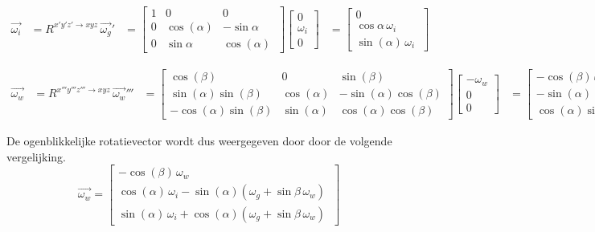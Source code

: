 \begin{equation*}
\begin{split}
\overrightarrow{\omega_{i}}
&=R^{x'y'z' \rightarrow xyz}\,\overrightarrow{\omega_{g}}'
&=	  \begin{bmatrix}
      1 & 0 & 0\\
      0 & \cos(\alpha) & -\sin{\alpha}\\ 
      0 & \sin{\alpha} & \cos(\alpha)\
      \end{bmatrix}
      \begin{bmatrix}
      0\\
      \omega_{i}\\
      0\
      \end{bmatrix}     
&=	  \begin{bmatrix}
      0\\
      \cos{\alpha}\,\omega_{i}\\
      \sin(\alpha)\,\omega_{i}\
      \end{bmatrix}
\end{split}
\end{equation*}

\begin{equation*}
\begin{split}
\overrightarrow{\omega_{w}}
&=R^{x'''y'''z''' \rightarrow xyz}\,\overrightarrow{\omega_{w}}'''
&=	  \begin{bmatrix}
      \cos(\beta) & 0 & \sin(\beta)\\
      \sin(\alpha)\sin(\beta) & \cos(\alpha) & -\sin(\alpha)\cos(\beta)\\
      -\cos(\alpha)\sin(\beta) & \sin(\alpha) & \cos(\alpha)\cos(\beta)\  
      \end{bmatrix}
      \begin{bmatrix}
      -\omega_{w}\\
      0\\
      0\
      \end{bmatrix}
&=    \begin{bmatrix}
      -\cos(\beta)\,\omega_{w}\\
      -\sin(\alpha)\sin(\beta)\,\omega_{w}\\
      \cos(\alpha)\sin(\beta)\,\omega_{w}\
      \end{bmatrix}
\end{split}
\end{equation*}

De ogenblikkelijke rotatievector wordt dus weergegeven door door de volgende vergelijking.
\begin{equation*}
\overrightarrow{\omega_{w}}=
\begin{bmatrix}
	-\cos(\beta)\,\omega_{w}\\
	\cos(\alpha)\,\omega_{i} - \sin(\alpha)(\omega_{g}+\sin{\beta}\,\omega_{w})\\
	\sin(\alpha)\,\omega_{i} + \cos(\alpha)(\omega_{g}+\sin{\beta}\,\omega_{w})\
\end{bmatrix}
\end{equation*}

